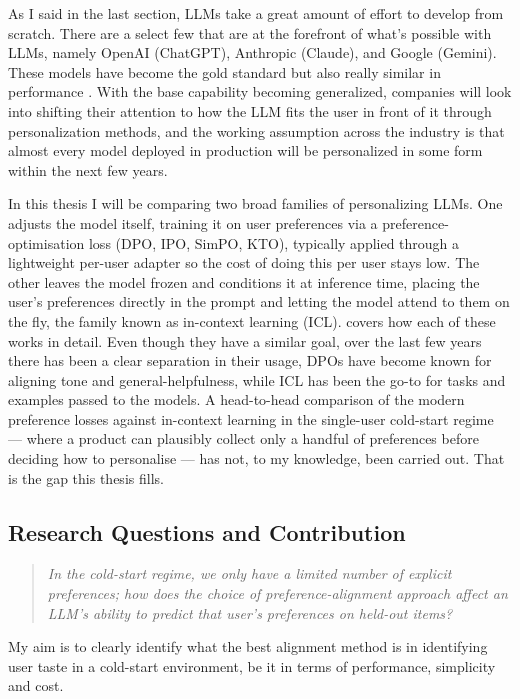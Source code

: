 As I said in the last section, LLMs take a great amount of effort to develop from scratch. There are a select few that are at the forefront of what's possible with LLMs, namely OpenAI (ChatGPT), Anthropic (Claude), and Google (Gemini). These models have become the gold standard but also really similar in performance \citep{chiang2024arena}. With the base capability becoming generalized, companies will look into shifting their attention to how the LLM fits the user in front of it through personalization methods, and the working assumption across the industry is that almost every model deployed in production will be personalized in some form within the next few years.

In this thesis I will be comparing two broad families of personalizing LLMs. One adjusts the model itself, training it on user preferences via a preference-optimisation loss (DPO, IPO, SimPO, KTO), typically applied through a lightweight per-user adapter so the cost of doing this per user stays low. The other leaves the model frozen and conditions it at inference time, placing the user's preferences directly in the prompt and letting the model attend to them on the fly, the family known as in-context learning (ICL).  covers how each of these works in detail. Even though they have a similar goal, over the last few years there has been a clear separation in their usage, DPOs have become known for aligning tone and general-helpfulness, while ICL has been the go-to for tasks and examples passed to the models. A head-to-head comparison of the modern preference losses against in-context learning in the single-user cold-start regime --- where a product can plausibly collect only a handful of preferences before deciding how to personalise --- has not, to my knowledge, been carried out. That is the gap this thesis fills.



\subsection{Research Questions and Contribution}
\label{sec:intro:rq}

\begin{quote}
\itshape
 In the cold-start regime, we only have a limited number of explicit preferences; how does the choice of preference-alignment approach affect an LLM's ability to predict that user's preferences on held-out items?
\end{quote}

My aim is to clearly identify what the best alignment method is in identifying user taste in a cold-start environment, be it in terms of performance, simplicity and cost.

